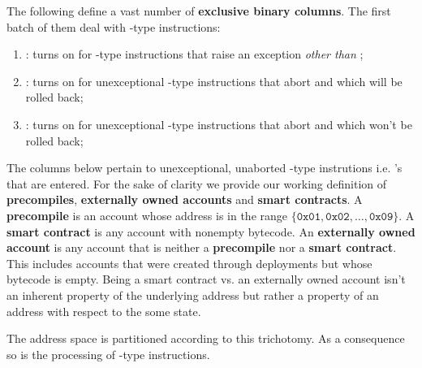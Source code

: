 The following define a vast number of \textbf{exclusive binary columns}. The first batch of them deal with -type instructions:
\begin{enumerate}
	\item \scenCallException:
		turns on for -type instructions that raise an exception \emph{other than} \suxSH{};
	\item \scenCallAbortWillRevert:
		turns on for unexceptional -type instructions that abort and which will be rolled back;
	\item \scenCallAbortWontRevert:
		turns on for unexceptional -type instructions that abort and which won't be rolled back;
\end{enumerate}
The columns below pertain to unexceptional, unaborted -type instrutions i.e. 's that are entered. 
For the sake of clarity we provide our working definition of \textbf{precompiles}, \textbf{externally owned accounts} and \textbf{smart contracts}.
A \textbf{precompile} is an account whose address is in the range $\{\texttt{0x01},\texttt{0x02},\dots, \texttt{0x09}\}$.
A \textbf{smart contract} is any account with nonempty bytecode.
An \textbf{externally owned account} is any account that is neither a \textbf{precompile} nor a \textbf{smart contract}. 
This includes accounts that were created through deployments but whose bytecode is empty.
Being a smart contract vs. an externally owned account isn't an inherent property of the underlying address but rather a property of an address with respect to the some state. 

\saNote{} The address space is partitioned according to this trichotomy. As a consequence so is the processing of -type instructions.

